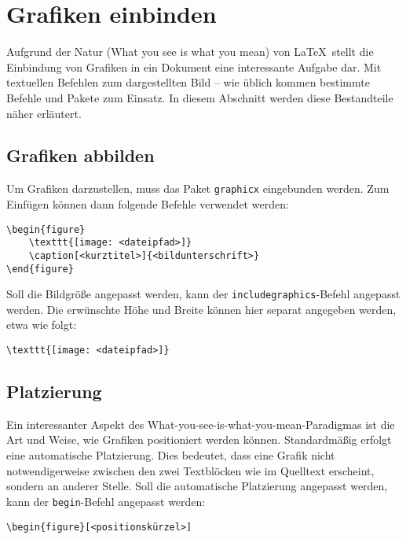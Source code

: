 \section{Grafiken einbinden} %
\label{sec:grafiken_einbinden}
Aufgrund der Natur (What you see is what you mean) von \LaTeX \  stellt die Einbindung von Grafiken in ein Dokument eine interessante Aufgabe dar. Mit textuellen Befehlen zum dargestellten Bild -- wie üblich kommen bestimmte Befehle und Pakete zum Einsatz. In diesem Abschnitt werden diese Bestandteile näher erläutert.

\subsection{Grafiken abbilden} %
\label{sub:grafiken_abbilden}
Um Grafiken darzustellen, muss das Paket \texttt{graphicx} eingebunden werden. Zum Einfügen können dann folgende Befehle verwendet werden:  

\begin{verbatim}
\begin{figure}
	\texttt{[image: <dateipfad>]}
	\caption[<kurztitel>]{<bildunterschrift>}
\end{figure}
\end{verbatim}

\noindent Soll die Bildgröße angepasst werden, kann der \texttt{includegraphics}-Befehl angepasst werden. 
Die erwünschte Höhe und Breite können hier separat angegeben werden, etwa wie folgt: 

\begin{verbatim}
\texttt{[image: <dateipfad>]}
\end{verbatim}

\subsection{Platzierung} %
\label{sub:platzierung}
Ein interessanter Aspekt des What-you-see-is-what-you-mean-Paradigmas ist die Art und Weise, wie Grafiken positioniert werden können. Standardmäßig erfolgt eine automatische Platzierung. Dies bedeutet, dass eine Grafik nicht notwendigerweise zwischen den zwei Textblöcken wie im Quelltext erscheint, sondern an anderer Stelle. Soll die automatische Platzierung angepasst werden, kann der \texttt{begin}-Befehl angepasst werden:

\begin{verbatim}
\begin{figure}[<positionskürzel>]
\end{verbatim}

